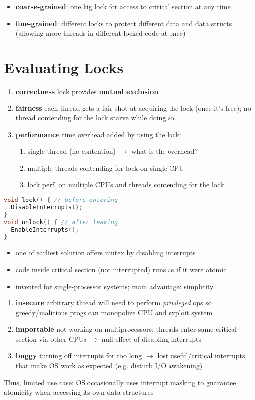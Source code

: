 \documentclass[8pt,a4paper,landscape]{extarticle}
\begin{document}
\begin{multicols*}{3}
\begin{itemize}
\item \textbf{coarse-grained}: one big lock for access to critical section at any time
\item \textbf{fine-grained}: different locks to protect different data and data structs (allowing more threads in different locked code at once)
\end{itemize}
\section*{Evaluating Locks}
\begin{enumerate}
\item \textbf{correctness} lock provides \textbf{mutual exclusion}
\item \textbf{fairness} each thread gets a fair shot at acquiring the lock (once it's free); no thread contending for the lock starve while doing so
\item \textbf{performance} time overhead added by using the lock:
  \begin{enumerate}
  \item single thread (no contention) $\to$ what is the overhead?
  \item multiple threads contending for lock on single CPU
  \item lock perf. on multiple CPUs and threads contending for the lock
  \end{enumerate}
\end{enumerate}
\begin{minipage}{.5\linewidth}
\begin{lstlisting}[language=c,xrightmargin=2pt]
void lock() { // before entering
  DisableInterrupts();
}
void unlock() { // after leaving
  EnableInterrupts();
}
\end{lstlisting}
\end{minipage}
\begin{minipage}{.5\linewidth}
  \begin{itemize}
  \item one of earliest solution offers mutex by disabling interrupts
  \item code inside critical section (not interrupted) runs as if it were atomic
  \item invented for single-processor systems;  main advantage: simplicity
  \end{itemize}
\end{minipage}
\begin{enumerate}
\item \textbf{insecure} arbitrary thread will need to perform \emph{privileged} ops so greedy/malicious progs can monopolize CPU and exploit system
\item \textbf{importable} not working on multiprocessors: threads enter same critical section via other CPUs $\to$ null effect of disabling interrupts
\item \textbf{buggy} turning off interrupts for too long $\to$ lost useful/critical interrupts that make OS work as expected (e.g. disturb I/O awakening)
\end{enumerate}
Thus, limited use case: OS occasionally uses interrupt masking to guarantee atomicity when accessing its own data structures

\end{multicols*}
\end{document}

